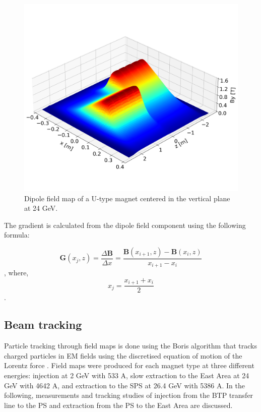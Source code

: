 \documentclass[a4paper,
               biblatex,     %
               keeplastbox,   %
               ]{jacow}
\begin{document}
\begin{figure}[!htb]
   \centering
   \includegraphics*[width=1.0\columnwidth, trim={0 2.9cm 0 4.3cm},clip]{MOPOTK030_f3.png}
   \caption{Dipole field map of a U-type magnet centered in the vertical plane at 24 GeV.}
   \label{fig:dipole_field}
\end{figure}

The gradient is calculated from the dipole field component using the following formula:
 
$$ \boldsymbol{G}(x_{j},z) = \frac{\Delta\boldsymbol{B}}{\Delta x} = \frac{\boldsymbol{B}(x_{i+1},z) - \boldsymbol{B}(x_{i},z)}{x_{i+1}-x_{i}} $$,
where,
$$ x_{j} = \frac{x_{i+1} + x_{i}}{{2}} $$.

\subsection{Beam tracking}

Particle tracking through field maps is done using the Boris algorithm that tracks charged particles in EM fields using the discretised equation of motion of the Lorentz force \cite{dutheil_pybttrackersborispy_nodate,qin_why_2013,ripperda_comprehensive_2018}. Field maps were produced for each magnet type at three different energies: injection at 2 GeV with 533 A, slow extraction to the East Area at 24 GeV with 4642 A, and extraction to the SPS at 26.4 GeV with 5386 A. In the following, measurements and tracking studies of injection from the BTP transfer line to the PS and extraction from the PS to the East Area are discussed.
\end{document}
